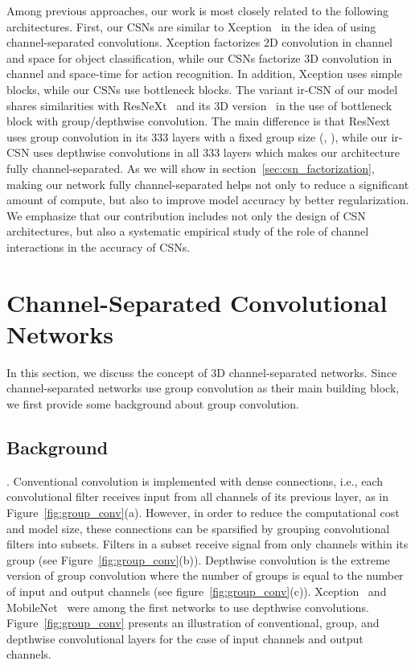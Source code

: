 \documentclass[10pt,twocolumn,letterpaper]{article}
\newcommand{\ddd}[1]{#1#1#1}
\begin{document}
Among previous approaches, our work is most closely related to the following architectures. First, our CSNs are similar to Xception~\cite{Xception} in the idea of using channel-separated convolutions. Xception factorizes 2D convolution in channel and space for object classification, while our CSNs factorize 3D convolution in channel and space-time for action recognition. In addition, Xception uses simple blocks, while our CSNs use bottleneck blocks. The variant ir-CSN of our model shares similarities with ResNeXt~\cite{SainingXie17} and its 3D version~\cite{retrace} in the use of bottleneck block with group/depthwise convolution. The main difference is that ResNext~\cite{SainingXie17,retrace} uses group convolution in its \ddd{3} layers with a fixed group size (\eg, ), while our ir-CSN uses depthwise convolutions in all \ddd{3} layers which makes our architecture fully channel-separated. As we will show in section~\ref{sec:csn_factorization}, making our network fully channel-separated helps not only to reduce a significant amount of compute, but also to improve model accuracy by better regularization. We emphasize that our contribution includes not only the design of CSN architectures, but also a systematic empirical study of the role of channel interactions in the accuracy of CSNs. 
\section{Channel-Separated Convolutional Networks}
\label{sec:channel_separated_network}

In this section, we discuss the concept of 3D channel-separated networks. Since channel-separated networks use group convolution as their main building block, we first provide some background about group convolution.

\subsection{Background}
\label{sec:background}




. Conventional convolution is implemented with dense connections, i.e., each convolutional filter receives input from all channels of its previous layer, as in Figure~\ref{fig:group_conv}(a). However, in order to reduce the computational cost and model size, these connections can be sparsified by grouping convolutional filters into subsets. Filters in a subset receive signal from only channels within its group (see Figure~\ref{fig:group_conv}(b)). Depthwise convolution is the extreme version of group convolution where the number of groups is equal to the number of input and output channels (see figure~\ref{fig:group_conv}(c)). Xception~\cite{Xception} and MobileNet~\cite{MobileNet} were among the first networks to use depthwise convolutions. Figure~\ref{fig:group_conv} presents an illustration of conventional, group, and depthwise convolutional layers for the case of  input channels and  output channels.
\end{document}
